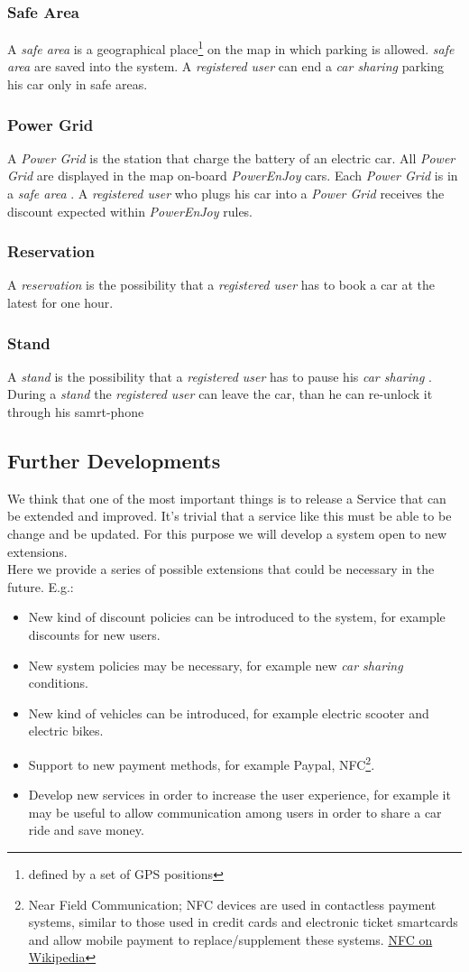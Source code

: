 \documentclass[english]{article}
\newcommand{\carsharing}{\textit {car sharing }}
\newcommand{\powerenjoy}{\textit{PowerEnJoy }}
\newcommand{\registereduser}{\textit {registered user }}
\newcommand{\safearea}{\textit{safe area }}
\newcommand{\powergrid}{\textit{Power Grid }}
\newcommand{\resevation}{\textit{reservation }}
\newcommand{\stand}{\textit{stand }}
\begin{document}
		\subsubsection {Safe Area}
			A \safearea is a  geographical place\footnote{defined by a set of GPS positions} on the map in which parking is allowed. \safearea are saved into the system. A \registereduser can end a \carsharing parking his car only in safe areas.
	\subsubsection{Power Grid}
		A \powergrid is the station that charge the battery of an electric car. All \powergrid are displayed in the map on-board \powerenjoy cars. Each \powergrid is in a \safearea. A \registereduser who plugs his car into a \powergrid receives the discount expected within \powerenjoy rules.
	\subsubsection{Reservation}
		A \resevation is the possibility that a \registereduser has to book a car at the latest for one hour.
	\subsubsection{Stand}
		A \stand is the possibility that a \registereduser has to pause his \carsharing. During a \stand the \registereduser can leave the car, than he can re-unlock it through his samrt-phone 

\subsection{Further Developments}
	We think that one of the most important things is to release a Service that can be extended and improved. It's trivial that a service like this must be able to be change and be updated.
	For this purpose we will develop a system open to new extensions. \\
	Here we provide a series of possible extensions that could be necessary in the future.
	E.g.:
	\begin{itemize}
		\item New kind of discount policies can be introduced to the system, for example discounts for new users. 
		\item New system policies may be necessary, for example new \carsharing conditions.
		\item New kind of vehicles can be introduced, for example electric scooter and electric bikes.
		\item Support to new payment methods, for example Paypal\textregistered, NFC\footnote{Near Field Communication; NFC devices are used in contactless payment systems, similar to those used in credit cards and electronic ticket smartcards and allow mobile payment to replace/supplement these systems. \href{https://en.wikipedia.org/wiki/Near_field_communication}{NFC on Wikipedia}}.
		\item Develop new services in order to increase the user experience, for example it may be useful to allow communication among users in order to share a car ride and save money.
	\end{itemize}
\end{document}
